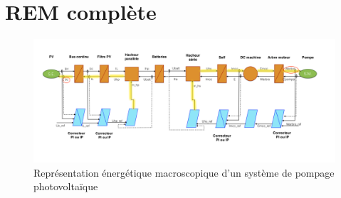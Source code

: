 \section{REM complète}\label{annex}
\begin{figure}[H]
\begin{center}
	\includegraphics[width=0.87\textheight,angle=90]{images/REM.png}
	\caption{Représentation énergétique macroscopique d'un système de pompage photovoltaïque}\label{img:REM PV pompe}
\end{center}
\end{figure} 
\FloatBarrier